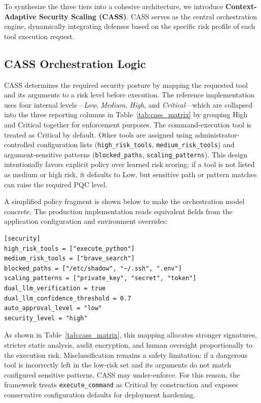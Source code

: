\documentclass[conference]{IEEEtran}
\begin{document}
To synthesize the three tiers into a cohesive architecture, we introduce \textbf{Context-Adaptive Security Scaling (CASS)}. CASS serves as the central orchestration engine, dynamically integrating defenses based on the specific risk profile of each tool execution request.

\subsection{CASS Orchestration Logic}
CASS determines the required security posture by mapping the requested tool and its arguments to a risk level before execution. The reference implementation uses four internal levels---\textit{Low}, \textit{Medium}, \textit{High}, and \textit{Critical}---which are collapsed into the three reporting columns in Table~\ref{tab:cass_matrix} by grouping High and Critical together for enforcement purposes. The command-execution tool is treated as Critical by default. Other tools are assigned using administrator-controlled configuration lists (\texttt{high\_risk\_tools}, \texttt{medium\_risk\_tools}) and argument-sensitive patterns (\texttt{blocked\_paths}, \texttt{scaling\_patterns}). This design intentionally favors explicit policy over learned risk scoring: if a tool is not listed as medium or high risk, it defaults to Low, but sensitive path or pattern matches can raise the required PQC level.

A simplified policy fragment is shown below to make the orchestration model concrete. The production implementation reads equivalent fields from the application configuration and environment overrides:
\begin{lstlisting}[language={},caption={Example CASS policy fragment},label={lst:cass_policy}]
[security]
high_risk_tools = ["execute_python"]
medium_risk_tools = ["brave_search"]
blocked_paths = ["/etc/shadow", "~/.ssh", ".env"]
scaling_patterns = ["private_key", "secret", "token"]
dual_llm_verification = true
dual_llm_confidence_threshold = 0.7
auto_approval_level = "low"
security_level = "high"
\end{lstlisting}

As shown in Table~\ref{tab:cass_matrix}, this mapping allocates stronger signatures, stricter static analysis, audit encryption, and human oversight proportionally to the execution risk. Misclassification remains a safety limitation: if a dangerous tool is incorrectly left in the low-risk set and its arguments do not match configured sensitive patterns, CASS may under-enforce. For this reason, the framework treats \texttt{execute\_command} as Critical by construction and exposes conservative configuration defaults for deployment hardening.
\end{document}
